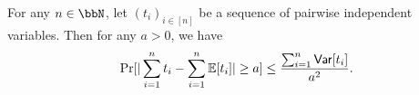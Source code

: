 \begin{theorem}
\label{thm:cheb}
For any $n\in\N$, let $( t_i)_{i\in [n]}$ be a sequence of pairwise independent variables. Then for any $a>0$, we have
$$\Pr[|\sum_{i=1}^n t_i-\sum_{i=1}^n\mathbb E[ t_i]|\geq a]\leq \frac{\sum_{i=1}^n\mathsf{Var}[ t_i]}{a^2}.$$
\end{theorem}



